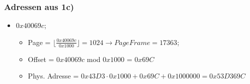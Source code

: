 \subsubsection{Adressen aus 1c)}
\begin{itemize}
\item $0x40069c$; 
	\begin{itemize}
		\item Page = $\lfloor \frac{0x40069c}{0x1000} \rfloor = 1024 \rightarrow PageFrame = 17363$;  
		\item Offset = $0x40069c$ mod $0x1000$  = $0x69C$
		\item Phys. Adresse = $0x43D3 \cdot 0x1000 + 0x69C + 0x1000000= 0x53D369C$
	\end{itemize}
\end{itemize}

